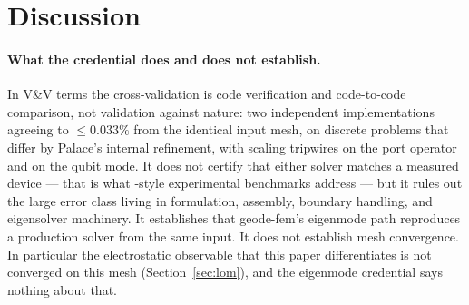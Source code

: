 \documentclass{anvil-paper}
\begin{document}
\section{Discussion}
\label{sec:discussion}

\paragraph{What the credential does and does not establish.}
In V\&V terms \citep{roache1997quantification,oberkampf2010verification}
the cross-validation is code verification and code-to-code comparison,
not validation against nature: two independent implementations agreeing
to $\leq 0.033\%$ from the identical input mesh, on discrete problems
that differ by Palace's internal refinement, with scaling tripwires on
the port operator and on the qubit mode. It does not certify that either
solver matches a measured device --- that is what
\citet{ye2025electromagnetic}-style experimental benchmarks address ---
but it rules out the large error class living in formulation, assembly,
boundary handling, and eigensolver machinery. It establishes that
geode-fem's eigenmode path reproduces a production solver from the same
input. It does not establish mesh convergence. In particular the
electrostatic observable that this paper differentiates is not
converged on this mesh (Section~\ref{sec:lom}), and the eigenmode
credential says nothing about that.
\end{document}
